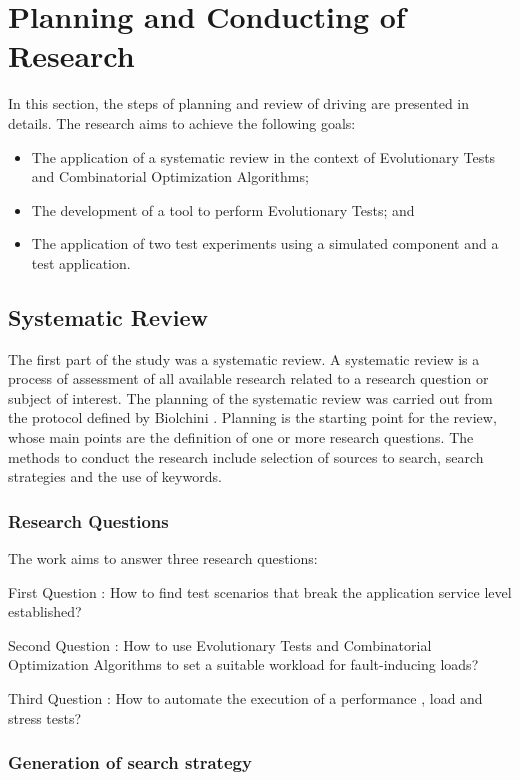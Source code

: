 \section{Planning and Conducting of Research}

In this section, the steps of planning and review of driving are presented in details. The research aims to achieve the following goals:

\begin{itemize}
\item The application of a systematic review in the context of Evolutionary Tests and Combinatorial Optimization Algorithms;
\item The development of a tool to perform Evolutionary Tests; and
\item The application of two test experiments using a simulated component and a test application.
\end{itemize}

\subsection{Systematic Review}

The first part of the study was a systematic review. A systematic review is a process of assessment of all available research related to a research question or subject of interest. The planning of the systematic review was carried out from the protocol defined by Biolchini \cite{Biolchini2005} \cite{Afzal2009}. Planning is the starting point for the review, whose main points are the definition of one or more research questions. The methods  to conduct the research  include selection of sources to search, search strategies and the use of keywords.

\subsubsection{Research Questions}

The work aims to answer three research questions:


First Question : How to find test scenarios that break the application service level established?

Second Question : How to use Evolutionary Tests and Combinatorial Optimization Algorithms  to set a suitable workload for fault-inducing loads?

Third Question : How to automate the execution of a performance , load and stress tests?

\subsubsection{Generation of search strategy}

